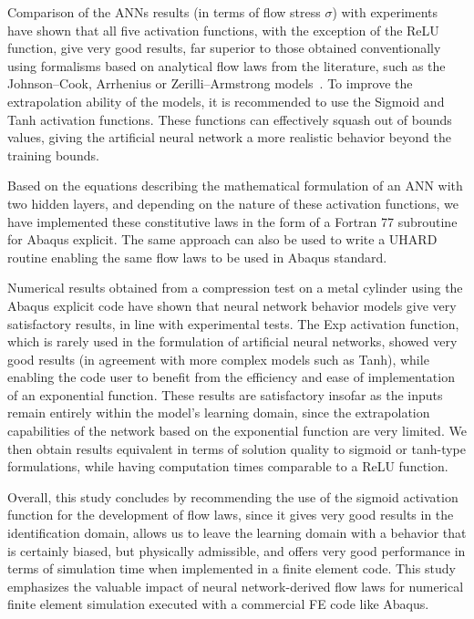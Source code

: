 \documentclass[algorithms,article,accept,pdftex,oneauthor]{Definitions/mdpi}
\begin{document}
Comparison of the ANNs results (in terms of flow stress $\sigma$) with experiments have shown that all five activation functions, with the exception of the ReLU function, give very good results, far superior to those obtained conventionally using formalisms based on analytical flow laws from the literature, such as the Johnson--Cook, Arrhenius or Zerilli--Armstrong models~\cite{Tize-2023-IEP}.
To improve the extrapolation ability of the models, it is recommended to use the Sigmoid and Tanh activation functions.
These functions can effectively squash out of bounds values, giving the artificial neural network a more realistic behavior beyond the training bounds.

Based on the equations describing the mathematical formulation of an ANN with two hidden layers, and depending on the nature of these activation functions, we have implemented these constitutive laws in the form of a Fortran 77 subroutine for Abaqus explicit.
The same approach can also be used to write a UHARD routine enabling the same flow laws to be used in Abaqus standard.

Numerical results obtained from a compression test on a metal cylinder using the Abaqus explicit code have shown that neural network behavior models give very satisfactory results, in line with experimental tests.
The Exp activation function, which is rarely used in the formulation of artificial neural networks, showed very good results (in agreement with more complex models such as Tanh), while enabling the code user to benefit from the efficiency and ease of implementation of an exponential function.
These results are satisfactory insofar as the inputs remain entirely within the model's learning domain, since the extrapolation capabilities of the network based on the exponential function are very limited.
We then obtain results equivalent in terms of solution quality to sigmoid or tanh-type formulations, while having computation times comparable to a ReLU function.

Overall, this study concludes by recommending the use of the sigmoid activation function for the development of flow laws, since it gives very good results in the identification domain, allows us to leave the learning domain with a behavior that is certainly biased, but physically admissible, and offers very good performance in terms of simulation time when implemented in a finite element code.
This study emphasizes the valuable impact of neural network-derived flow laws for numerical finite element simulation executed with a commercial FE code like Abaqus.
\end{document}
